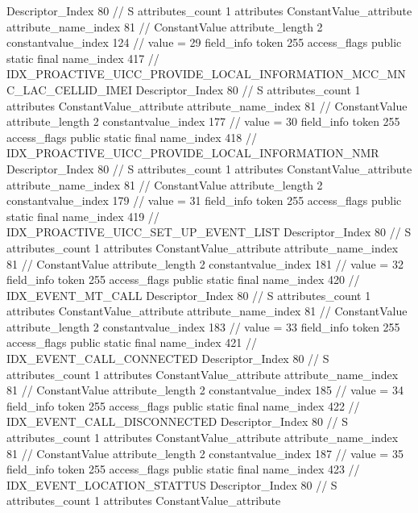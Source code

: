 {{{{{				Descriptor_Index	80		// S
				attributes_count	1
				attributes {
				ConstantValue_attribute {
					attribute_name_index	81		// ConstantValue
					attribute_length	2
					constantvalue_index	124		// value = 29
				}
				}
			}
			field_info {
				token	255
				access_flags	public static final
				name_index	417		// IDX_PROACTIVE_UICC_PROVIDE_LOCAL_INFORMATION_MCC_MNC_LAC_CELLID_IMEI
				Descriptor_Index	80		// S
				attributes_count	1
				attributes {
				ConstantValue_attribute {
					attribute_name_index	81		// ConstantValue
					attribute_length	2
					constantvalue_index	177		// value = 30
				}
				}
			}
			field_info {
				token	255
				access_flags	public static final
				name_index	418		// IDX_PROACTIVE_UICC_PROVIDE_LOCAL_INFORMATION_NMR
				Descriptor_Index	80		// S
				attributes_count	1
				attributes {
				ConstantValue_attribute {
					attribute_name_index	81		// ConstantValue
					attribute_length	2
					constantvalue_index	179		// value = 31
				}
				}
			}
			field_info {
				token	255
				access_flags	public static final
				name_index	419		// IDX_PROACTIVE_UICC_SET_UP_EVENT_LIST
				Descriptor_Index	80		// S
				attributes_count	1
				attributes {
				ConstantValue_attribute {
					attribute_name_index	81		// ConstantValue
					attribute_length	2
					constantvalue_index	181		// value = 32
				}
				}
			}
			field_info {
				token	255
				access_flags	public static final
				name_index	420		// IDX_EVENT_MT_CALL
				Descriptor_Index	80		// S
				attributes_count	1
				attributes {
				ConstantValue_attribute {
					attribute_name_index	81		// ConstantValue
					attribute_length	2
					constantvalue_index	183		// value = 33
				}
				}
			}
			field_info {
				token	255
				access_flags	public static final
				name_index	421		// IDX_EVENT_CALL_CONNECTED
				Descriptor_Index	80		// S
				attributes_count	1
				attributes {
				ConstantValue_attribute {
					attribute_name_index	81		// ConstantValue
					attribute_length	2
					constantvalue_index	185		// value = 34
				}
				}
			}
			field_info {
				token	255
				access_flags	public static final
				name_index	422		// IDX_EVENT_CALL_DISCONNECTED
				Descriptor_Index	80		// S
				attributes_count	1
				attributes {
				ConstantValue_attribute {
					attribute_name_index	81		// ConstantValue
					attribute_length	2
					constantvalue_index	187		// value = 35
				}
				}
			}
			field_info {
				token	255
				access_flags	public static final
				name_index	423		// IDX_EVENT_LOCATION_STATTUS
				Descriptor_Index	80		// S
				attributes_count	1
				attributes {
				ConstantValue_attribute {
}}}}}}}
